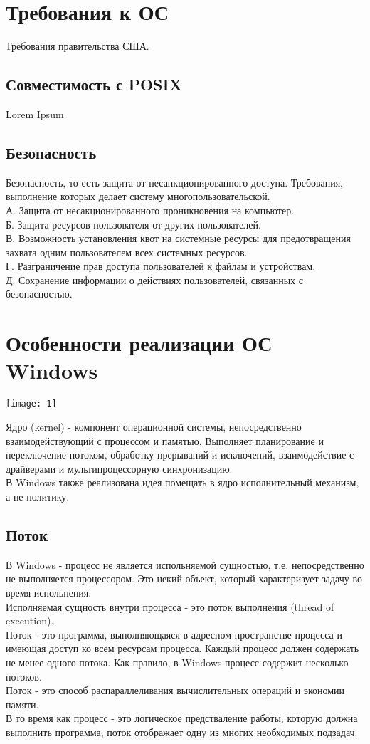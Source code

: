 \documentclass[a4paper]{article}
\begin{document}
\section*{Требования к ОС}
\setcounter{section}{2}
Требования правительства США.
\subsection{Совместимость с POSIX}%
\setcounter{subsection}{6}
Lorem Ipsum
\subsection{Безопасность}%
\setcounter{subsection}{7}
Безопасность, то есть защита от несанкционированного доступа. Требования, выполнение которых делает систему многопользовательской.\\
А. Защита от несакционированного проникновения на компьютер.\\
Б. Защита ресурсов пользователя от других пользователей.\\
В. Возможность установления квот на системные ресурсы для предотвращения захвата одним пользователем всех системных ресурсов.\\
Г. Разграничение прав доступа пользователей к файлам и устройствам.\\
Д. Сохранение информации о действиях пользователей, связанных с безопасностью.\\
\section{Особенности реализации ОС Windows}
\setcounter{section}{3}
\setcounter{subsection}{0}
\begin{center}	
	\texttt{[image: 1]}
\end{center}
Ядро (kernel) - компонент операционной системы, непосредственно взаимодействующий с процессом и памятью. Выполняет планирование и переключение потоком, обработку прерываний и исключений, взаимодействие с драйверами и мультипроцессорную синхронизацию.\\
В Windows также реализована идея помещать в ядро исполнительный механизм, а не политику.\\
\subsection{Поток}%
В Windows - процесс не является испольняемой сущностью, т.е. непосредственно не выполняется процессором. Это некий объект, который характеризует задачу во время испольнения.\\
Исполняемая сущность внутри процесса - это поток выполнения (thread of execution).\\
Поток - это программа, выполняющаяся в адресном пространстве процесса и имеющая доступ ко всем ресурсам процесса. Каждый процесс должен содержать не менее одного потока. Как правило, в Windows процесс содержит несколько потоков.\\
Поток - это способ распараллеливания вычислительных операций и экономии памяти.\\
В то время как процесс - это логическое предстваление работы, которую должна выполнить программа, поток отображает одну из многих необходимых подзадач.\\
\end{document}
